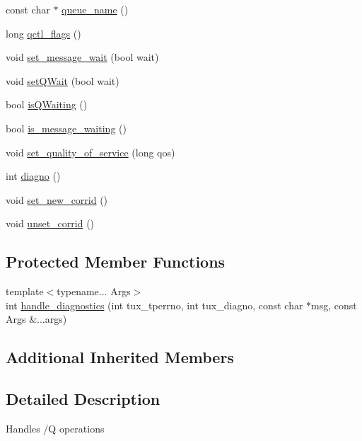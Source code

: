 \begin{DoxyCompactItemize}
\item 
const char $\ast$ \hyperlink{classatmi_1_1queue_adaddc33c75ec6e13f6c57da8d979ad32}{queue\+\_\+name} ()
\item 
long \hyperlink{classatmi_1_1queue_a96f51996c857985c9b8e1b720f726f0c}{qctl\+\_\+flags} ()
\item 
void \hyperlink{classatmi_1_1queue_a9669776889226a450093d2ddfd921d4b}{set\+\_\+message\+\_\+wait} (bool wait)
\item 
void \hyperlink{classatmi_1_1queue_a223fac7945fb8d87f04189aa77ce666a}{set\+Q\+Wait} (bool wait)
\item 
bool \hyperlink{classatmi_1_1queue_a90f5a71979755634b1e625d45ac61412}{is\+Q\+Waiting} ()
\item 
bool \hyperlink{classatmi_1_1queue_ac655db1db167f3e833f4fa84e6256428}{is\+\_\+message\+\_\+waiting} ()
\item 
void \hyperlink{classatmi_1_1queue_a0fbca137aadc2946b8f3889b76352af9}{set\+\_\+quality\+\_\+of\+\_\+service} (long qos)
\item 
int \hyperlink{classatmi_1_1queue_a1fabff1d9a56389a41f92542561d570d}{diagno} ()
\item 
void \hyperlink{classatmi_1_1queue_a2c0511c9f17e939789c5290fe83d1f1f}{set\+\_\+new\+\_\+corrid} ()
\item 
void \hyperlink{classatmi_1_1queue_aa74de8091c32580972e7871e7ddf786c}{unset\+\_\+corrid} ()
\end{DoxyCompactItemize}
\subsection*{Protected Member Functions}
\begin{DoxyCompactItemize}
\item 
{\footnotesize template$<$typename... Args$>$ }\\int \hyperlink{classatmi_1_1queue_a767f80e22a52d4b325d5a5aadc27a343}{handle\+\_\+diagnostics} (int tux\+\_\+tperrno, int tux\+\_\+diagno, const char $\ast$msg, const Args \&...args)
\end{DoxyCompactItemize}
\subsection*{Additional Inherited Members}


\subsection{Detailed Description}
Handles /Q operations 


